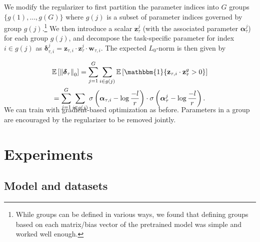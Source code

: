 We modify the regularizer to first partition the parameter indices into $G$ groups $\{g(1), \dots, g(G)\}$ where $g(j)$ is a subset of parameter indices governed by group $g(j)$.\footnote{While groups can be defined in various ways, we found that defining groups based on each matrix/bias vector of the pretrained model  was simple and worked well enough.} We then introduce a scalar $\mathbf{z}_{\tau}^j$ (with the associated parameter $\boldsymbol{\alpha}_{\tau}^{j}$) for each group $g(j)$, and decompose the task-specific parameter for index $i \in g(j)$ as $
    \boldsymbol{\delta}_{\tau, i}^j = \mathbf{z}_{\tau, i} \cdot \mathbf{z}_{\tau}^j  \cdot \mathbf{w}_{\tau, i}. $ The expected $L_0$-norm is then given by

\begin{align*}
    & \mathbb{E}\left[\Vert \boldsymbol{\delta}_\tau \right \Vert_0] =  \sum_{j = 1}^G \sum_{i \in g(j)}  \mathbb{E}\left[\mathbbm{1}\{\mathbf{z}_{\tau,i} \cdot \mathbf{z}_{\tau}^g  > 0 \} \right] \\
    &=  \sum_{j = 1}^G \sum_{i \in g(j)}  \sigma\left(\boldsymbol{\alpha}_{\tau,i} - \log \frac{-l}{r} \right) \cdot \sigma\left(\boldsymbol{\alpha}_{\tau}^j - \log \frac{-l}{r} \right). \\[-7mm]
\end{align*}

We can train with gradient-based optimization as before. Parameters in a group are encouraged by the regularizer to be removed jointly.

\section{Experiments}

\label{sec:exp}
\subsection{Model and datasets}

